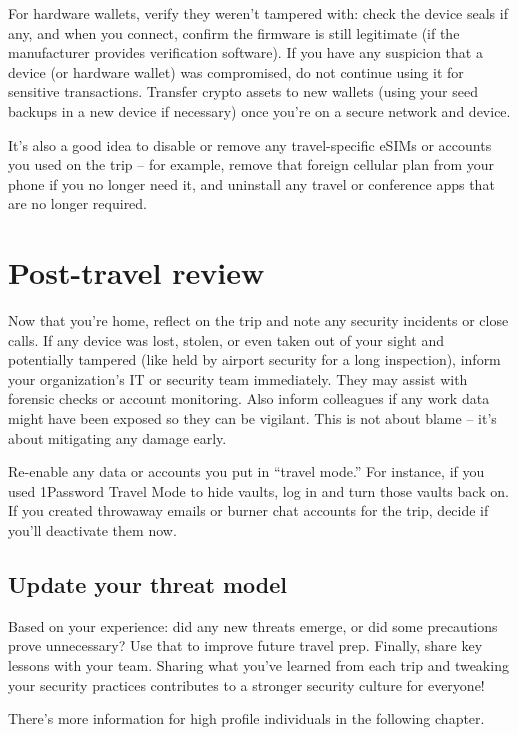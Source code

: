 For hardware wallets, verify they weren't tampered with:
check the device seals if any, and when you connect,
confirm the firmware is still legitimate (if the
manufacturer provides verification software). If you have
any suspicion that a device (or hardware wallet) was
compromised, do not continue using it for sensitive
transactions. Transfer crypto assets to new wallets (using
your seed backups in a new device if necessary) once
you're on a secure network and device.

It's also a good idea to disable or remove any
travel-specific eSIMs or accounts you used on the trip --
for example, remove that foreign cellular plan from your
phone if you no longer need it, and uninstall any travel
or conference apps that are no longer required.

\section{Post-travel review}

Now that you're home, reflect on the trip and note any
security incidents or close calls. If any device was lost,
stolen, or even taken out of your sight and potentially
tampered (like held by airport security for a long
inspection), inform your organization's IT or security
team immediately. They may assist with forensic checks or
account monitoring. Also inform colleagues if any work
data might have been exposed so they can be vigilant. This
is not about blame -- it's about mitigating any damage
early.

Re-enable any data or accounts you put in ``travel mode.''
For instance, if you used 1Password Travel Mode to hide
vaults, log in and turn those vaults back on. If you
created throwaway emails or burner chat accounts for the
trip, decide if you'll deactivate them now.

\subsection{Update your threat model}

Based on your experience: did any new threats emerge, or
did some precautions prove unnecessary? Use that to
improve future travel prep. Finally, share key lessons
with your team. Sharing what you've learned from each trip
and tweaking your security practices contributes to a
stronger security culture for everyone!

There's more information for high profile individuals in
the following chapter.

